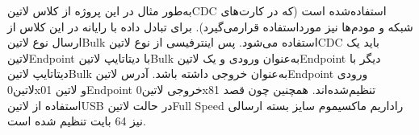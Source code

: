 به‌طور مثال در این پروژه از کلاس ‌لاتین{CDC} استفاده‌شده است (که در کارت‌های شبکه و مودم‌ها نیز مورداستفاده قرارمی‌گیرد). برای تبادل داده با رایانه در این کلاس از ارسال نوع ‌لاتین{Bulk} استفاده می‌شود. پس اینترفیسی از نوع ‌لاتین{CDC} باید یک ‌لاتین{Endpoint} با دیتاتایپ ‌لاتین{Bulk} به‌عنوان ورودی و یک ‌لاتین{Endpoint} دیگر با دیتاتایپ ‌لاتین{Bulk} به‌عنوان خروجی داشته باشد. آدرس ‌لاتین{Endpoint} ورودی ‌لاتین{0x01} و ‌لاتین{Endpoint} خروجی ‌لاتین{0x81} تنظیم‌شده‌اند. همچنین چون قصد استفاده از ‌لاتین{USB} در حالت ‌لاتین{Full Speed} راداریم ماکسیموم سایز بسته ارسالی نیز 64 بایت تنظیم شده است. 